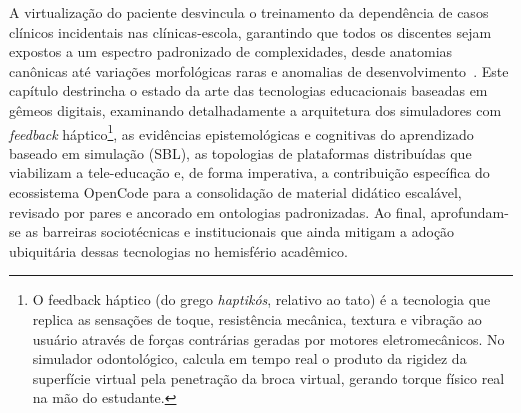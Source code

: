 A virtualização do paciente desvincula o treinamento da dependência de casos clínicos incidentais nas clínicas-escola, garantindo que todos os discentes sejam expostos a um espectro padronizado de complexidades, desde anatomias canônicas até variações morfológicas raras e anomalias de desenvolvimento~\cite{khoshfekr2025review}. Este capítulo destrincha o estado da arte das tecnologias educacionais baseadas em gêmeos digitais, examinando detalhadamente a arquitetura dos simuladores com \textit{feedback} háptico\footnote{O feedback háptico (do grego \textit{haptikós}, relativo ao tato) é a tecnologia que replica as sensações de toque, resistência mecânica, textura e vibração ao usuário através de forças contrárias geradas por motores eletromecânicos. No simulador odontológico, calcula em tempo real o produto da rigidez da superfície virtual pela penetração da broca virtual, gerando torque físico real na mão do estudante.}, as evidências epistemológicas e cognitivas do aprendizado baseado em simulação (SBL), as topologias de plataformas distribuídas que viabilizam a tele-educação e, de forma imperativa, a contribuição específica do ecossistema OpenCode para a consolidação de material didático escalável, revisado por pares e ancorado em ontologias padronizadas. Ao final, aprofundam-se as barreiras sociotécnicas e institucionais que ainda mitigam a adoção ubiquitária dessas tecnologias no hemisfério acadêmico.

